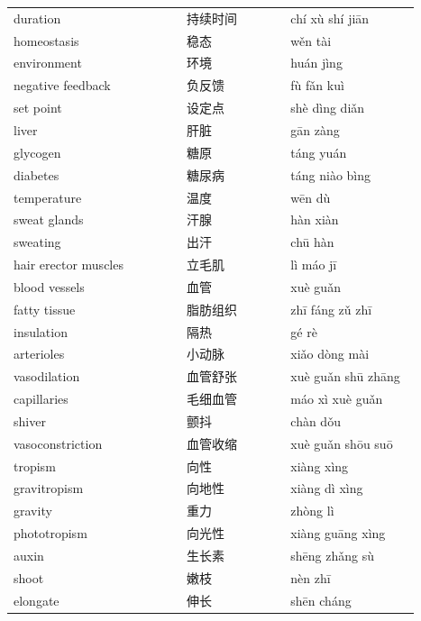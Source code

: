 \documentclass[11pt]{article}
\begin{document}
\begin{longtable}{@{}p{0.40\linewidth}p{0.24\linewidth}p{0.30\linewidth}@{}}
duration & 持续时间 & chí xù shí jiān \\
homeostasis & 稳态 & wěn tài \\
environment & 环境 & huán jìng \\
negative feedback & 负反馈 & fù fǎn kuì \\
set point & 设定点 & shè dìng diǎn \\
liver & 肝脏 & gān zàng \\
glycogen & 糖原 & táng yuán \\
diabetes & 糖尿病 & táng niào bìng \\
temperature & 温度 & wēn dù \\
sweat glands & 汗腺 & hàn xiàn \\
sweating & 出汗 & chū hàn \\
hair erector muscles & 立毛肌 & lì máo jī \\
blood vessels & 血管 & xuè guǎn \\
fatty tissue & 脂肪组织 & zhī fáng zǔ zhī \\
insulation & 隔热 & gé rè \\
arterioles & 小动脉 & xiǎo dòng mài \\
vasodilation & 血管舒张 & xuè guǎn shū zhāng \\
capillaries & 毛细血管 & máo xì xuè guǎn \\
shiver & 颤抖 & chàn dǒu \\
vasoconstriction & 血管收缩 & xuè guǎn shōu suō \\
tropism & 向性 & xiàng xìng \\
gravitropism & 向地性 & xiàng dì xìng \\
gravity & 重力 & zhòng lì \\
phototropism & 向光性 & xiàng guāng xìng \\
auxin & 生长素 & shēng zhǎng sù \\
shoot & 嫩枝 & nèn zhī \\
elongate & 伸长 & shēn cháng \\
\end{longtable}
\end{document}
